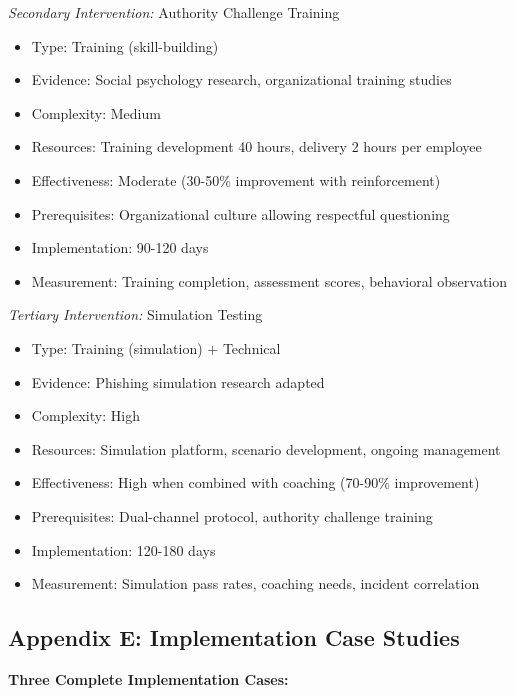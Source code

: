 \documentclass[11pt,a4paper]{article}
\begin{document}
\textit{Secondary Intervention:} Authority Challenge Training
\begin{itemize}
\item Type: Training (skill-building)
\item Evidence: Social psychology research, organizational training studies
\item Complexity: Medium
\item Resources: Training development 40 hours, delivery 2 hours per employee
\item Effectiveness: Moderate (30-50\% improvement with reinforcement)
\item Prerequisites: Organizational culture allowing respectful questioning
\item Implementation: 90-120 days
\item Measurement: Training completion, assessment scores, behavioral observation
\end{itemize}

\textit{Tertiary Intervention:} Simulation Testing
\begin{itemize}
\item Type: Training (simulation) + Technical
\item Evidence: Phishing simulation research adapted
\item Complexity: High
\item Resources: Simulation platform, scenario development, ongoing management
\item Effectiveness: High when combined with coaching (70-90\% improvement)
\item Prerequisites: Dual-channel protocol, authority challenge training
\item Implementation: 120-180 days
\item Measurement: Simulation pass rates, coaching needs, incident correlation
\end{itemize}

\subsection{Appendix E: Implementation Case Studies}

\textbf{Three Complete Implementation Cases:}
\end{document}
